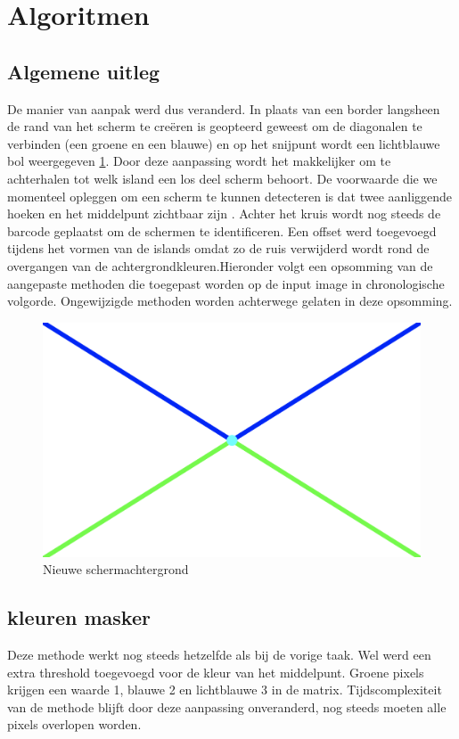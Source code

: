 \section{Algoritmen}
\subsection{Algemene uitleg}
De manier van aanpak werd dus veranderd. In plaats van een border langsheen de rand van het scherm te creëren is geopteerd geweest om de diagonalen te verbinden (een groene en een blauwe) en op het snijpunt wordt een lichtblauwe bol weergegeven \ref{fig:screen}. Door deze aanpassing wordt het makkelijker om te achterhalen tot welk island een los deel scherm behoort. De voorwaarde die we momenteel opleggen om een scherm te kunnen detecteren is dat twee aanliggende hoeken en het middelpunt zichtbaar zijn \label{voorwaarde}. Achter het kruis wordt nog steeds de barcode geplaatst om de schermen te identificeren.
Een offset werd toegevoegd tijdens het vormen van de islands omdat zo de ruis verwijderd wordt rond de overgangen van de achtergrondkleuren.Hieronder volgt een opsomming van de aangepaste methoden die toegepast worden op de input image in chronologische volgorde. Ongewijzigde methoden worden achterwege gelaten in deze opsomming.

\begin{figure} [h]
	\center
	\includegraphics[width=\textwidth]{screen}
	\caption{Nieuwe schermachtergrond}
	\label{fig:screen}
\end{figure}

\subsection{kleuren masker}
Deze methode werkt nog steeds hetzelfde als bij de vorige taak. Wel werd een extra threshold toegevoegd voor de kleur van het middelpunt. Groene pixels krijgen een waarde 1, blauwe 2 en lichtblauwe 3 in de matrix. Tijdscomplexiteit van de methode blijft door deze aanpassing onveranderd, nog steeds moeten alle pixels overlopen worden.

